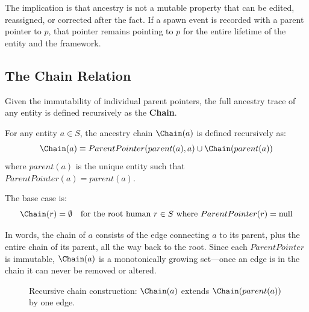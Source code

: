 The implication is that ancestry is not a mutable property that can be edited, reassigned, or corrected after the fact. If a spawn event is recorded with a parent pointer to $p$, that pointer remains pointing to $p$ for the entire lifetime of the entity and the framework.

\subsection{The Chain Relation}

Given the immutability of individual parent pointers, the full ancestry trace of any entity is defined recursively as the \textbf{Chain}.

\begin{definition}
For any entity $a \in S$, the ancestry chain $\Chain(a)$ is defined recursively as:
\[
\Chain(a) \equiv ParentPointer(parent(a), a) \cup \Chain(parent(a))
\]
where $parent(a)$ is the unique entity such that $ParentPointer(a) = parent(a)$.

The base case is:
\[
\Chain(r) = \emptyset \quad \text{for the root human } r \in S \text{ where } ParentPointer(r) = \text{null}
\]
\end{definition}

In words, the chain of $a$ consists of the edge connecting $a$ to its parent, plus the entire chain of its parent, all the way back to the root. Since each $ParentPointer$ is immutable, $\Chain(a)$ is a monotonically growing set—once an edge is in the chain it can never be removed or altered.

\begin{figure}[H]
\centering
{}
\caption{Recursive chain construction: $\Chain(a)$ extends $\Chain(parent(a))$ by one edge.}
\label{fig:chain-recursion}
\end{figure}


